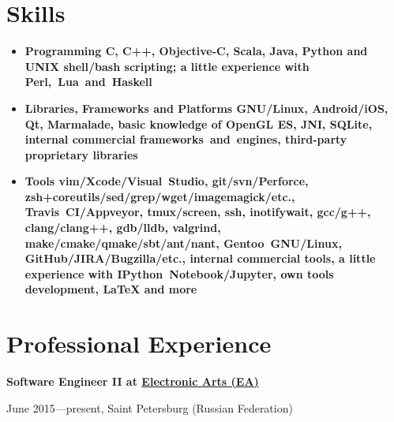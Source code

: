 \section*{Skills}

\begin{itemize}[rightmargin=\dimexpr\linewidth-17.5cm-\leftmargin\relax]
    \item \bfseries Programming\mdseries
        \subitem
        C,
        \bfseries C++\mdseries,
        Objective-C,
        \bfseries Scala\mdseries,
        Java,
        \bfseries Python \mdseries and UNIX \bfseries shell/bash \mdseries scripting;
        a little experience with Perl,~Lua~and~Haskell

    \vspace{0.4cm}
    \item \bfseries Libraries, Frameworks and Platforms\mdseries
        \subitem
        \bfseries GNU/Linux\mdseries,
        Android/iOS,
        \bfseries Qt\mdseries,
        Marmalade,
        basic knowledge of OpenGL ES,
        JNI,
        SQLite,
        internal commercial frameworks~and~engines,
        third-party proprietary libraries

    \vspace{0.4cm}
    \item \bfseries Tools\mdseries
        \subitem
        \bfseries vim\mdseries/Xcode/Visual~Studio,
        \bfseries git\mdseries/svn/Perforce,
        zsh+coreutils/sed/grep/wget/imagemagick/etc.,\\
        Travis~CI/Appveyor,
        tmux/screen,
        ssh,
        inotifywait,
        gcc/g++,
        clang/clang++,
        \bfseries gdb\mdseries/lldb,
        valgrind,\\
        make/cmake/qmake/sbt/ant/nant,
        \bfseries Gentoo~\mdseries GNU/Linux,
        GitHub/JIRA/Bugzilla/etc.,
        internal commercial tools,
        a little experience with IPython~Notebook/\bfseries Jupyter\mdseries,
        own \bfseries tools development\mdseries,
        {\LaTeX }
        and more
\end{itemize}

\section*{Professional Experience}
{
\fontsize{12pt}{12pt}\selectfont
\bfseries Software Engineer II at
\href{http://www.ea.com}{Electronic Arts (EA)}
\mdseries
}

{
\fontsize{9pt}{8pt}\selectfont
June 2015---present, Saint Petersburg (Russian Federation)
}
\vspace{0.5cm}


